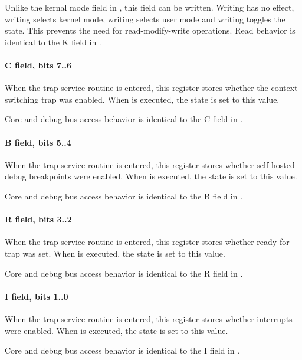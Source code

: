 Unlike the kernal mode field in , this field can be written. Writing
 has no effect, writing  selects kernel mode, writing
 selects user mode and writing  toggles the state. This
prevents the need for read-modify-write operations. Read behavior is identical
to the K field in .
\paragraph*{C field, bits 7..6}
When the trap service routine is entered, this register stores whether the
context switching trap was enabled. When  is executed, the state is
set to this value.

Core and debug bus access behavior is identical to the C field in .
\paragraph*{B field, bits 5..4}
When the trap service routine is entered, this register stores whether
self-hosted debug breakpoints were enabled. When  is executed, the
state is set to this value.

Core and debug bus access behavior is identical to the B field in .
\paragraph*{R field, bits 3..2}
When the trap service routine is entered, this register stores whether
ready-for-trap was set. When  is executed, the state is set to this
value.

Core and debug bus access behavior is identical to the R field in .
\paragraph*{I field, bits 1..0}
When the trap service routine is entered, this register stores whether
interrupts were enabled. When  is executed, the state is set to this
value.

Core and debug bus access behavior is identical to the I field in .
